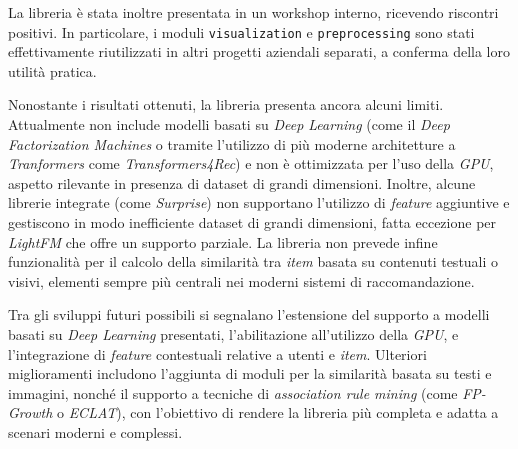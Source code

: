 La libreria è stata inoltre presentata in un workshop interno, ricevendo riscontri positivi. In particolare, i moduli \texttt{visualization} e \texttt{preprocessing} sono stati effettivamente riutilizzati in altri progetti aziendali separati, a conferma della loro utilità pratica.

Nonostante i risultati ottenuti, la libreria presenta ancora alcuni limiti. Attualmente non include modelli basati su \textit{Deep Learning} (come il \textit{Deep Factorization Machines} o tramite l'utilizzo di più moderne architetture a \textit{Tranformers} come \textit{Transformers4Rec}) e non è ottimizzata per l'uso della \textit{GPU}, aspetto rilevante in presenza di dataset di grandi dimensioni. Inoltre, alcune librerie integrate (come \textit{Surprise}) non supportano l'utilizzo di \textit{feature} aggiuntive e gestiscono in modo inefficiente dataset di grandi dimensioni, fatta eccezione per \textit{LightFM} che offre un supporto parziale. La libreria non prevede infine funzionalità per il calcolo della similarità tra \textit{item} basata su contenuti testuali o visivi, elementi sempre più centrali nei moderni sistemi di raccomandazione.

Tra gli sviluppi futuri possibili si segnalano l'estensione del supporto a modelli basati su \textit{Deep Learning} presentati, l'abilitazione all'utilizzo della \textit{GPU}, e l'integrazione di \textit{feature} contestuali relative a utenti e \textit{item}. Ulteriori miglioramenti includono l'aggiunta di moduli per la similarità basata su testi e immagini, nonché il supporto a tecniche di \textit{association rule mining} (come \textit{FP-Growth} o \textit{ECLAT}), con l'obiettivo di rendere la libreria più completa e adatta a scenari moderni e complessi.

